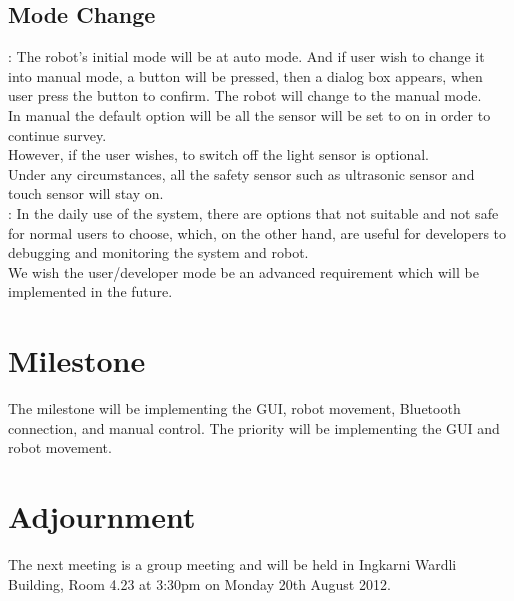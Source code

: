 \documentclass[11pt, a4paper]{article}
\begin{document}
\subsection{Mode Change}
: The robot's initial mode will be at auto mode. And if user wish to change it into manual mode, a button will be pressed, then a dialog box appears, when user press the button to confirm. The robot will change to the manual mode.\\
In manual the default option will be all the sensor will be set to on in order to continue survey.\\
However, if the user wishes, to switch off the light sensor is optional.\\
Under any circumstances, all the safety sensor such as ultrasonic sensor and touch sensor will stay on.\\

: In the daily use of the system, there are options that not suitable and not safe for normal users to choose, which, on the other hand, are useful for developers to debugging and monitoring the system and robot.\\
We wish the user/developer mode be an advanced requirement which will be implemented in the future.\\

\section{Milestone}
The milestone will be implementing the GUI, robot movement, Bluetooth connection, and manual control. The priority will be implementing the GUI and robot movement. 

\section{Adjournment}
The next meeting is a group meeting and will be held in Ingkarni Wardli Building, Room 4.23 at 3:30pm on Monday 20th August 2012.

\vspace*{10pt}
\end{document}
